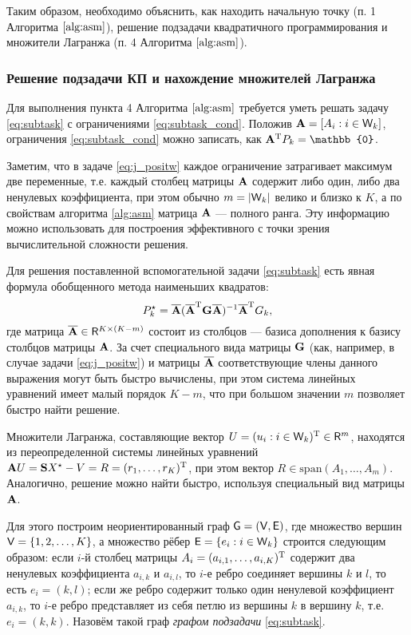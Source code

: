 \documentclass[10pt]{article}
\begin{document}
Таким образом, необходимо объяснить, как находить начальную точку (п. 1 Алгоритма $\ref{alg:asm}$), решение подзадачи квадратичного программирования и множители Лагранжа (п. 4 Алгоритма $\ref{alg:asm}$).


\subsubsection{Решение подзадачи КП и нахождение множителей Лагранжа}
Для выполнения пункта 4 Алгоритма $\ref{alg:asm}$ требуется уметь решать задачу \eqref{eq:subtask} с ограничениями \eqref{eq:subtask_cond}. Положив $\mathbf{A} = [A_i : i \in \mathsf{W}_k]$, ограничения \eqref{eq:subtask_cond} можно записать, как $\bfA^\rmT P_k = \mathbb{0}$.

Заметим, что в задаче \eqref{eq:j_positw} каждое ограничение затрагивает максимум две переменные, т.е. каждый столбец матрицы $\mathbf{A}$ содержит либо один, либо два ненулевых коэффициента, при этом обычно $m = |\mathsf{W}_k|$ велико и близко к $K$, а по свойствам алгоритма \ref{alg:asm} матрица $\mathbf{A}$ --- полного ранга. Эту информацию можно использовать для построения эффективного с точки зрения вычислительной сложности решения.

Для решения поставленной вспомогательной задачи \eqref{eq:subtask} есть явная формула обобщенного метода наименьших квадратов:
\begin{equation*}
P_k^\star = \overline {\mathbf{A}} (\overline {\mathbf{A}}^{\mathrm{T}} \mathbf{G} \overline {\mathbf{A}})^{-1} \overline {\mathbf{A}}^{\mathrm{T}} G_k,
\end{equation*}
где матрица $\overline {\mathbf{A}} \in \mathsf{R}^{K \times (K-m)}$ состоит из столбцов --- базиса дополнения к базису столбцов матрицы $\mathbf{A}$. За счет специального вида матрицы $\mathbf{G}$ (как, например, в случае задачи \eqref{eq:j_positw}) и матрицы $\overline {\mathbf{A}}$ соответствующие члены данного выражения могут быть быстро вычислены, при этом система линейных уравнений имеет малый порядок $K-m$, что при большом значении $m$ позволяет быстро найти решение.

Множители Лагранжа, составляющие вектор $U = (u_i : i \in \mathsf{W}_k)^{\mathrm{T}} \in \mathsf{R}^{m}$, находятся из переопределенной системы линейных уравнений $\mathbf{A} U =  \mathbf{S} X^\star - V = R = (r_1, \ldots, r_K)^{\mathrm{T}}$, при этом вектор $R \in \text{span}(A_1, \ldots, A_m)$. Аналогично, решение можно найти быстро, используя специальный вид матрицы $\mathbf{A}$.

Для этого построим неориентированный граф $\mathsf{G}=(\mathsf{V}, \mathsf{E})$, где множество вершин $\mathsf{V} = \{1, 2, \ldots, K\}$, а множество рёбер $\mathsf{E} = \{e_i : i \in \mathsf{W}_k \}$ строится следующим образом: если $i$-й столбец матрицы $A_i = (a_{i, 1}, \ldots, a_{i, K})^{\mathrm{T}}$ содержит два ненулевых коэффициента $a_{i,k}$ и $a_{i,l}$, то $i$-е ребро соединяет вершины $k$ и $l$, то есть $e_i = (k, l)$; если же ребро содержит только один ненулевой коэффициент $a_{i,k}$, то $i$-е ребро представляет из себя петлю из вершины $k$ в вершину $k$, т.е. $e_i=(k, k)$. Назовём такой граф \emph{графом подзадачи} \eqref{eq:subtask}.
\end{document}
